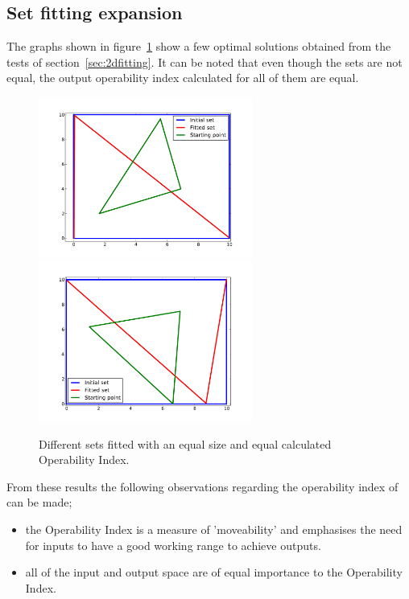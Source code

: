\subsection{Set fitting expansion}\label{sec:setfitfuture}
The graphs shown in figure~\ref{fig:equaloifits} show a few optimal solutions obtained from the tests of section~\ref{sec:2dfitting}.
It can be noted that even though the sets are not equal, the output operability index \citep{vinsonphd} calculated for all of them are equal.
\begin{figure}[htbp]
  \centering
    \includegraphics[width=7cm]{graph/2dfit1.pdf}
    \qquad
    \includegraphics[width=7cm]{graph/2dfit2.pdf}
  \caption[Equal size constraint set fits]{Different sets fitted with an equal size and equal calculated Operability Index.}
  \label{fig:equaloifits}
\end{figure}

From these results the following observations regarding the operability index of \citet{vinsonphd} can be made;
\begin{itemize}
\item the Operability Index is a measure of 'moveability' and emphasises the need for inputs to have a good working range to achieve outputs.
\item all of the input and output space are of equal importance to the Operability Index.
\end{itemize}

